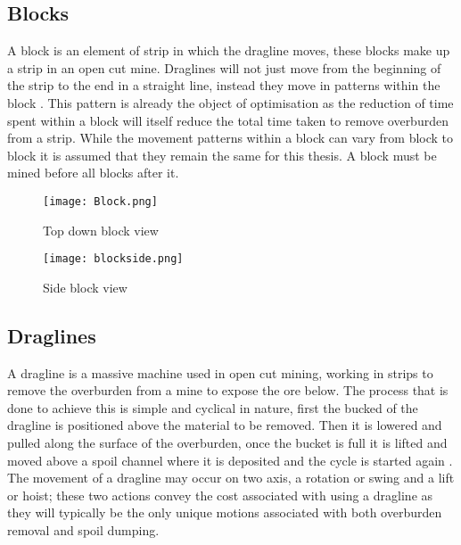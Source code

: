 \subsection{Blocks}
A block is an element of  strip in which the dragline moves, these blocks make up a strip in an open cut mine. \cite{SMEBOOK} Draglines will not just move from the beginning of the strip to the end in a straight line, instead they move in patterns within the block \cite{IntoOpenPit}. This pattern is already the object of optimisation as the reduction of time spent within a block will itself reduce the total time taken to remove overburden from a strip. While the movement patterns within a block can vary from block to block it is assumed that they remain the same for this thesis. A block must be mined before all blocks after it. 
\begin{figure}[h]
\caption{Top down block view}
\label{blk}
\texttt{[image: Block.png]}
\end{figure}
\begin{figure}[h]
\caption{Side block view}
\label{blk}
\texttt{[image: blockside.png]}
\end{figure}

\subsection{Draglines}
A dragline is a massive machine used in open cut mining, working in strips to remove the overburden from a mine to expose the ore below\cite{ORPlanning}. The process that is done to achieve this is simple and cyclical in nature, first the bucked of the dragline is positioned above the material to be removed. Then it is lowered and pulled along the surface of the overburden, once the bucket is full it is lifted and moved above a spoil channel where it is deposited and the cycle is started again \cite{Dynamic Model}. The movement of a dragline may occur on two axis, a rotation or swing and a lift or hoist; these two actions convey the cost associated with using a dragline as they will typically be the only unique motions associated with both overburden removal and spoil dumping\cite{A*Search}. 


